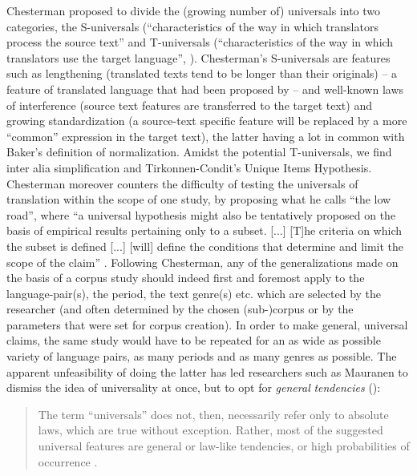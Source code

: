 Chesterman proposed to divide the (growing number of) universals into two categories, the S-universals (“characteristics of the way in which translators process the source text” \citealt[39]{gambier_what_2004} and T-universals (“characteristics of the way in which translators use the target language”, \citealt[39]{gambier_what_2004}). Chesterman’s S-universals are features such as lengthening (translated texts tend to be longer than their originals) – a feature of translated language that had been proposed by  \citet[185]{vinay_stylistique_1958} – and  well-known laws of interference (source text features are transferred to the target text) and growing standardization (a source-text specific feature will be replaced by a more ``common'' expression in the target text), the latter having a lot in common with Baker’s definition of normalization. Amidst the potential T-universals, we find inter alia simplification and Tirkonnen-Condit’s Unique Items Hypothesis. Chesterman moreover counters the difficulty of testing the universals of translation within the scope of one study, by proposing what he calls “the low road”, where “a universal hypothesis might also be tentatively proposed on the basis of empirical results pertaining only to a subset. [...] [T]he criteria on which the subset is defined [...] [will] define the conditions that determine and limit the scope of the claim” \citep[40]{gambier_what_2004}. Following Chesterman, any of the generalizations made on the basis of a corpus study should indeed first and foremost apply to the language-pair(s), the period, the text genre(s) etc. which are selected by the researcher (and often determined by the chosen (sub-)corpus or by the parameters that were set for corpus creation). In order to make general, universal claims, the same study would have to be repeated for an as wide as possible variety of language pairs, as many periods and as many genres as possible. The apparent unfeasibility of doing the latter has led researchers such as Mauranen to dismiss the idea of universality at once, but to opt for \textit{general} \textit{tendencies} (\citeyear[35]{anderman_universal_2008}):

\begin{quote}
The term ``universals'' does not, then, necessarily refer only to absolute laws, which are true without exception. Rather, most of the suggested universal features are general or law-like tendencies, or high probabilities of occurrence \citep[35]{anderman_universal_2008}.
\end{quote}

